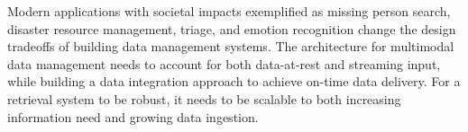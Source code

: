 

%
Modern applications with societal impacts exemplified as missing person search, disaster resource management, triage,
and emotion recognition change the design tradeoffs of building data management systems. 
The architecture for multimodal data management needs to account for both data-at-rest and streaming input, while building a data integration approach to achieve on-time data delivery. For a retrieval system to be robust, it needs to be scalable to both increasing information need and growing data ingestion.


